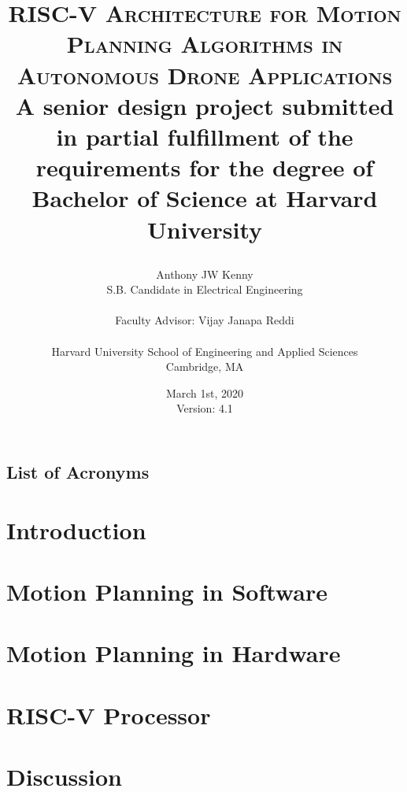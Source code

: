 \documentclass[
    11pt,           %
    letterpaper,    %
    draft,          %
    oneside         %
]{report}           %
\title{\textsc{RISC-V Architecture for Motion Planning Algorithms in Autonomous Drone Applications} \\ 
    \bigskip
    \small{A senior design project submitted in partial fulfillment of the requirements for the degree of Bachelor of Science at Harvard University} \\
\author{Anthony JW Kenny \\
        \small{S.B. Candidate in Electrical Engineering} \\ \\
        Faculty Advisor: Vijay Janapa Reddi \\ \\
        Harvard University School of Engineering and Applied Sciences \\
        \small{Cambridge, MA}}
\date{March 1st, 2020 \\ 
    \small{Version: 4.1}}}
\begin{document}
\maketitle


    
    \clearpage

    \tableofcontents
    \clearpage

    \section*{List of Acronyms}
    

    \listofalgorithms
 
    \listoffigures

    \listoftables



\chapter{Introduction}
    


\chapter{Motion Planning in Software}
    \label{chap:MotionPlanningInSoftware}
    

\chapter{Motion Planning in Hardware}

\chapter{RISC-V Processor}

\chapter{Discussion}
\end{document}
